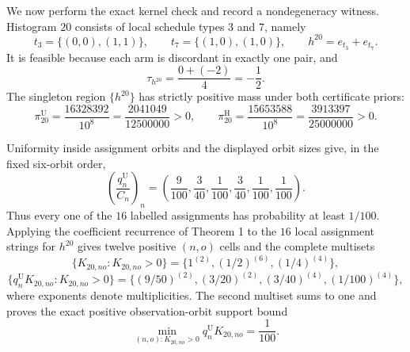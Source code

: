 We now perform the exact kernel check and record a nondegeneracy witness. Histogram \(20\) consists of local schedule types \(3\) and \(7\), namely
\[
 t_3=\{(0,0),(1,1)\},
 \qquad
 t_7=\{(1,0),(1,0)\},
 \qquad
 h^{20}=e_{t_3}+e_{t_7}.
\]
It is feasible because each arm is discordant in exactly one pair, and
\[
 \tau_{h^{20}}=\frac{0+(-2)}4=-\frac12.
\]
The singleton region \(\{h^{20}\}\) has strictly positive mass under both certificate priors:
\[
 \pi^{\mathrm U}_{20}=\frac{16328392}{10^8}
 =\frac{2041049}{12500000}>0,
 \qquad
 \pi^{\mathrm H}_{20}=\frac{15653588}{10^8}
 =\frac{3913397}{25000000}>0.
\]

Uniformity inside assignment orbits and the displayed orbit sizes give, in the fixed six-orbit order,
\[
 \left(\frac{q_n^{\mathrm U}}{C_n}\right)_n
 =\left(\frac9{100},\frac3{40},\frac1{100},
 \frac3{40},\frac1{100},\frac1{100}\right).
\]
Thus every one of the \(16\) labelled assignments has probability at least \(1/100\). Applying the coefficient recurrence of Theorem 1 to the \(16\) local assignment strings for \(h^{20}\) gives twelve positive \((n,o)\) cells and the complete multisets
\[
 \{K_{20,no}:K_{20,no}>0\}
 =\{1^{(2)},(1/2)^{(6)},(1/4)^{(4)}\},
\]
\[
 \{q_n^{\mathrm U}K_{20,no}:K_{20,no}>0\}
 =\{(9/50)^{(2)},(3/20)^{(2)},(3/40)^{(4)},(1/100)^{(4)}\},
\]
where exponents denote multiplicities. The second multiset sums to one and proves the exact positive observation-orbit support bound
\[
 \min_{(n,o):K_{20,no}>0}q_n^{\mathrm U}K_{20,no}=\frac1{100}.
\]

